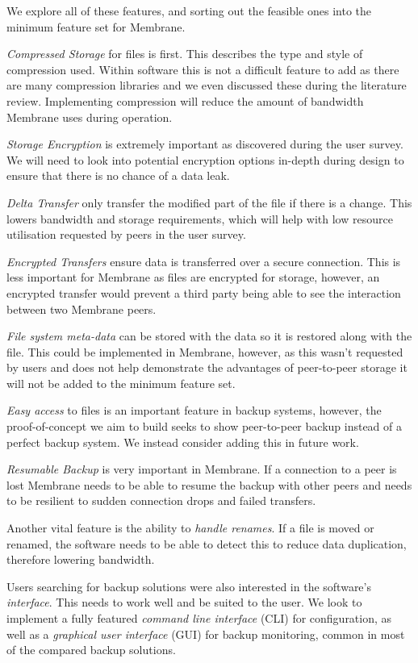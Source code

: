 \documentclass[11pt, a4paper, twoside]{report}
\begin{document}
We explore all of these features, and sorting out the feasible ones into the minimum feature set for Membrane.

\emph{Compressed Storage} for files is first. This describes the type and style of compression used. Within software this is not a difficult feature to add as there are many compression libraries and we even discussed these during the literature review. Implementing compression will reduce the amount of bandwidth Membrane uses during operation.

\emph{Storage Encryption} is extremely important as discovered during the user survey. We will need to look into potential encryption options in-depth during design to ensure that there is no chance of a data leak.

\emph{Delta Transfer} only transfer the modified part of the file if there is a change. This lowers bandwidth and storage requirements, which will help with low resource utilisation requested by peers in the user survey.

\emph{Encrypted Transfers} ensure data is transferred over a secure connection. This is less important for Membrane as files are encrypted for storage, however, an encrypted transfer would prevent a third party being able to see the interaction between two Membrane peers.

\emph{File system meta-data} can be stored with the data so it is restored along with the file. This could be implemented in Membrane, however, as this wasn't requested by users and does not help demonstrate the advantages of peer-to-peer storage it will not be added to the minimum feature set.

\emph{Easy access} to files is an important feature in backup systems, however, the proof-of-concept we aim to build seeks to show peer-to-peer backup instead of a perfect backup system. We instead consider adding this in future work.

\emph{Resumable Backup} is very important in Membrane. If a connection to a peer is lost Membrane needs to be able to resume the backup with other peers and needs to be resilient to sudden connection drops and failed transfers.

Another vital feature is the ability to \emph{handle renames}. If a file is moved or renamed, the software needs to be able to detect this to reduce data duplication, therefore lowering bandwidth.

Users searching for backup solutions were also interested in the software's \emph{interface}. This needs to work well and be suited to the user. We look to implement a fully featured \emph{command line interface} (CLI) for configuration, as well as a \emph{graphical user interface} (GUI) for backup monitoring, common in most of the compared backup solutions.
\end{document}
